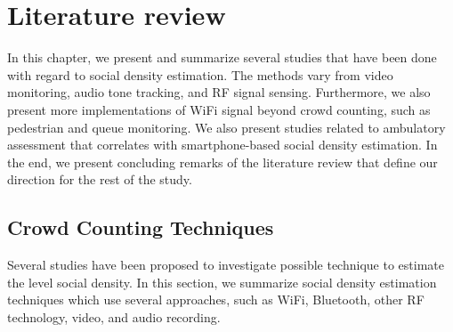 \chapter{Literature review}\label{ch:literature-review}


In this chapter, we present and summarize several studies that have been done with regard to social density estimation. The methods vary from video monitoring, audio tone tracking, and \ac{RF} signal sensing. Furthermore, we also present more implementations of WiFi signal beyond crowd counting, such as pedestrian and queue monitoring. We also present studies related to ambulatory assessment that correlates with smartphone-based social density estimation. In the end, we present concluding remarks of the literature review that define our direction for the rest of the study.



\section{Crowd Counting Techniques} %
\label{sec:crowd_counting_techniques}
Several studies have been proposed to investigate possible technique to estimate the level social density. In this section, we summarize social density estimation techniques which use several approaches, such as WiFi, Bluetooth, other \ac{RF} technology, video, and audio recording.

